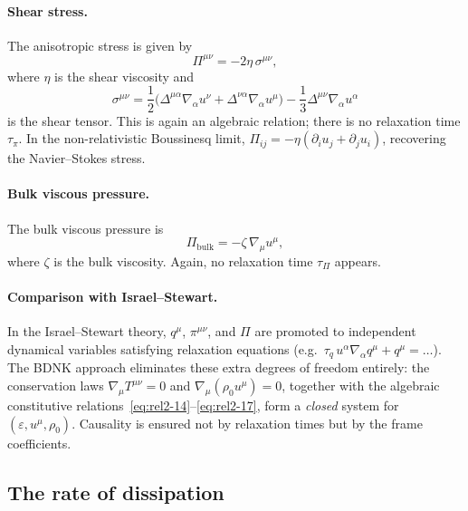 \paragraph{Shear stress.}
The anisotropic stress is given by
\begin{equation}
\label{eq:rel2-15}
  \Pi^{\mu\nu} = -2\eta\,\sigma^{\mu\nu},
\end{equation}
where $\eta$ is the shear viscosity and
\begin{equation}
\label{eq:rel2-16}
  \sigma^{\mu\nu} = \frac{1}{2}\bigl(
    \Delta^{\mu\alpha}\nabla_\alpha u^\nu
    + \Delta^{\nu\alpha}\nabla_\alpha u^\mu
  \bigr)
  - \frac{1}{3}\Delta^{\mu\nu}\nabla_\alpha u^\alpha
\end{equation}
is the shear tensor.  This is again an algebraic relation; there is no
relaxation time $\tau_\pi$.  In the non-relativistic Boussinesq limit,
$\Pi_{ij} = -\eta(\partial_i u_j + \partial_j u_i)$, recovering the
Navier--Stokes stress.

\paragraph{Bulk viscous pressure.}
The bulk viscous pressure is
\begin{equation}
\label{eq:rel2-17}
  \Pi_{\mathrm{bulk}} = -\zeta\,\nabla_\mu u^\mu,
\end{equation}
where $\zeta$ is the bulk viscosity.  Again, no relaxation time
$\tau_\Pi$ appears.

\paragraph{Comparison with Israel--Stewart.}
In the Israel--Stewart theory, $q^\mu$, $\pi^{\mu\nu}$, and $\Pi$ are
promoted to independent dynamical variables satisfying relaxation equations
(e.g.\ $\tau_q\,u^\alpha\nabla_\alpha q^\mu + q^\mu = \ldots$).  The BDNK
approach eliminates these extra degrees of freedom entirely: the
conservation laws $\nabla_\mu T^{\mu\nu} = 0$ and $\nabla_\mu(\rho_0 u^\mu) = 0$,
together with the algebraic constitutive
relations~\eqref{eq:rel2-14}--\eqref{eq:rel2-17}, form a \emph{closed}
system for $(\varepsilon, u^\mu, \rho_0)$.  Causality is ensured not by
relaxation times but by the frame coefficients.

\subsection{The rate of dissipation}\label{sec:rel7f}

